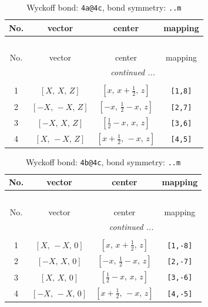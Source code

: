 \documentclass[fleqn,8pt]{jsarticle}
\begin{document}
\begin{longtable}{cccc}
\caption{Wyckoff bond: {\tt 4a@4c}, bond symmetry: {\tt ..m}}
 \\
 \hline \hline
No. & vector & center & mapping \\ \hline \endfirsthead

\multicolumn{3}{l}{\tablename\ \thetable{}} \\
 \hline \hline
No. & vector & center & mapping \\ \hline \endhead

 \hline \hline
\multicolumn{3}{r}{\footnotesize\it continued ...} \\ \endfoot

 \hline \hline
\multicolumn{3}{r}{} \\ \endlastfoot

1 & $\left[ X,\, X,\, Z \right]$ & $\left[ x,\, x + \frac{1}{2},\, z \right]$ & {\tt [1,8]} \\ \hline
2 & $\left[ - X,\, - X,\, Z \right]$ & $\left[ - x,\, \frac{1}{2} - x,\, z \right]$ & {\tt [2,7]} \\ \hline
3 & $\left[ - X,\, X,\, Z \right]$ & $\left[ \frac{1}{2} - x,\, x,\, z \right]$ & {\tt [3,6]} \\ \hline
4 & $\left[ X,\, - X,\, Z \right]$ & $\left[ x + \frac{1}{2},\, - x,\, z \right]$ & {\tt [4,5]} \\
\end{longtable}
\renewcommand{\arraystretch}{1.2}
\begin{longtable}{cccc}
\caption{Wyckoff bond: {\tt 4b@4c}, bond symmetry: {\tt ..m}}
 \\
 \hline \hline
No. & vector & center & mapping \\ \hline \endfirsthead

\multicolumn{3}{l}{\tablename\ \thetable{}} \\
 \hline \hline
No. & vector & center & mapping \\ \hline \endhead

 \hline \hline
\multicolumn{3}{r}{\footnotesize\it continued ...} \\ \endfoot

 \hline \hline
\multicolumn{3}{r}{} \\ \endlastfoot

1 & $\left[ X,\, - X,\, 0 \right]$ & $\left[ x,\, x + \frac{1}{2},\, z \right]$ & {\tt [1,-8]} \\ \hline
2 & $\left[ - X,\, X,\, 0 \right]$ & $\left[ - x,\, \frac{1}{2} - x,\, z \right]$ & {\tt [2,-7]} \\ \hline
3 & $\left[ X,\, X,\, 0 \right]$ & $\left[ \frac{1}{2} - x,\, x,\, z \right]$ & {\tt [3,-6]} \\ \hline
4 & $\left[ - X,\, - X,\, 0 \right]$ & $\left[ x + \frac{1}{2},\, - x,\, z \right]$ & {\tt [4,-5]} \\
\end{longtable}
\end{document}
